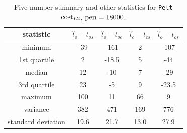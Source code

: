 \begin{table}[h]
    \begin{center}
    \begin{tabular}{|c|c|c|c|c|}
        \hline
        \textbf{statistic} & $\hat{t}_o-t_{os}$ & $\hat{t}_o-t_{oe}$ & $\hat{t}_c-t_{cs}$ & $\hat{t}_o-t_{os}$ \\ \hline
        minimum & -39 & -161 & 2 & -107 \\ \hline
        1st quartile & 2 & -18.5 & 5 & -44 \\ \hline
        median & 12 & -10 & 7 & -29 \\ \hline
        3rd quartile & 23 & -5 & 9 & -23.5 \\ \hline
        maximum & 100 & 11	& 66 & 9 \\ \hline
        variance & 382 & 471 & 169 & 776 \\ \hline
        standard deviation & 19.6 & 21.7 & 13.0 & 27.9 \\ \hline
    \end{tabular}
    \end{center}
    \caption{Five-number summary and other statistics for \texttt{Pelt} $\operatorname{cost}_{L2}$, $\operatorname{pen}=18000$.}
    \label{tab:statistics_pelt}
\end{table}

